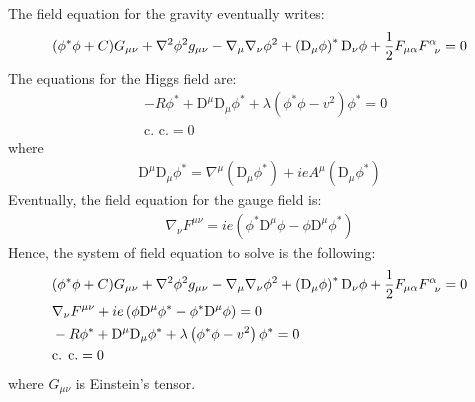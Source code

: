 The field equation for the gravity eventually writes:
\begin{align}
  (\phi^*\phi+C)G_{\mu\nu}+\nabla^2\phi^2g_{\mu\nu}-\nabla_\mu\nabla_\nu\phi^2 + \left(\mathrm{D}_\mu\phi\right)^*\mathrm{D}_\nu\phi+\frac{1}{2}F_{\mu\alpha}F^\alpha_{\hphantom{\alpha}\nu} = 0
\end{align}
The equations for the Higgs field are:
\begin{align}
  &-R\phi^*+\mathrm{D}^\mu\mathrm{D}_\mu\phi^*+\lambda\left(\phi^*\phi -v^2\right)\phi^* = 0\\
  &\text{c. c.} = 0
\end{align}
where
\begin{align}
  \mathrm{D}^\mu\mathrm{D}_\mu\phi^* = \nabla^\mu(\mathrm{D}_\mu\phi^*)+ieA^\mu\left(\mathrm{D}_\mu\phi^*\right)
\end{align}
Eventually, the field equation for the gauge field is:
\begin{align}
  \nabla_\nu F^{\mu\nu} = ie\left(\phi^*\mathrm{D}^\mu\phi-\phi\mathrm{D}^\mu\phi^*\right)
\end{align}
Hence, the system of field equation to solve is the following:
\begin{align}
  &(\phi^*\phi+C)G_{\mu\nu}+\nabla^2\phi^2g_{\mu\nu}-\nabla_\mu\nabla_\nu\phi^2 + \left(\mathrm{D}_\mu\phi\right)^*\mathrm{D}_\nu\phi+\frac{1}{2}F_{\mu\alpha}F^\alpha_{\hphantom{\alpha}\nu} = 0\label{eq:gravfieldeq_metric}\\
  &\nabla_\nu F^{\mu\nu} + ie\left(\phi\mathrm{D}^\mu\phi^*-\phi^*\mathrm{D}^\mu\phi\right) = 0\label{eq:gravfieldeq_gauge}\\
  &-R\phi^*+\mathrm{D}^\mu\mathrm{D}_\mu\phi^*+\lambda\left(\phi^*\phi -v^2\right)\phi^* = 0\label{eq:gravfieldeq_higgs}\\
  &\text{c. c.} = 0
\end{align}
where $G_{\mu\nu}$ is Einstein's tensor.
